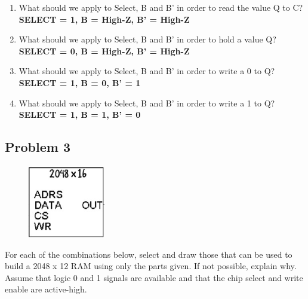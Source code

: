\documentclass{article}
\begin{document}
\begin{enumerate}[label=\alph*.]
\item What should we apply to Select, B and B’ in order to read the value Q to C? \\
\textbf{SELECT = 1, B = High-Z, B' = High-Z}
\item What should we apply to Select, B and B’ in order to hold a value Q? \\
\textbf{SELECT = 0, B = High-Z, B' = High-Z}
\item What should we apply to Select, B and B’ in order to write a 0 to Q? \\
\textbf{SELECT = 1, B = 0, B' = 1}
\item What should we apply to Select, B and B’ in order to write a 1 to Q?
\textbf{SELECT = 1, B = 1, B' = 0}
\end{enumerate}

\newpage
\subsection*{Problem 3}
\begin{figure}[!h]
    \centering
    \includegraphics[width=0.3\textwidth]{figures/memory_q1.jpg}
\end{figure}
For each of the combinations below, select and draw those that can be used to build a 2048 x 12 RAM using only the parts given. If not possible, explain why. Assume that logic 0 and 1 signals are available and that the chip select and write enable are active-high.
\end{document}
